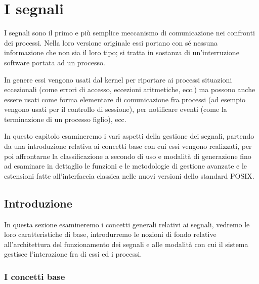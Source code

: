 
\chapter{I segnali}
\label{cha:signals}

I segnali sono il primo e più semplice meccanismo di comunicazione nei
confronti dei processi. Nella loro versione originale essi portano con sé
nessuna informazione che non sia il loro tipo; si tratta in sostanza di
un'interruzione software portata ad un processo.

In genere essi vengono usati dal kernel per riportare ai processi situazioni
eccezionali (come errori di accesso, eccezioni aritmetiche, ecc.) ma possono
anche essere usati come forma elementare di comunicazione fra processi (ad
esempio vengono usati per il controllo di sessione), per notificare eventi
(come la terminazione di un processo figlio), ecc.

In questo capitolo esamineremo i vari aspetti della gestione dei segnali,
partendo da una introduzione relativa ai concetti base con cui essi vengono
realizzati, per poi affrontarne la classificazione a secondo di uso e modalità
di generazione fino ad esaminare in dettaglio le funzioni e le metodologie di
gestione avanzate e le estensioni fatte all'interfaccia classica nelle nuovi
versioni dello standard POSIX.


\section{Introduzione}
\label{sec:sig_intro}

In questa sezione esamineremo i concetti generali relativi ai segnali, vedremo
le loro caratteristiche di base, introdurremo le nozioni di fondo relative
all'architettura del funzionamento dei segnali e alle modalità con cui il
sistema gestisce l'interazione fra di essi ed i processi.


\subsection{I concetti base}
\label{sec:sig_base}

